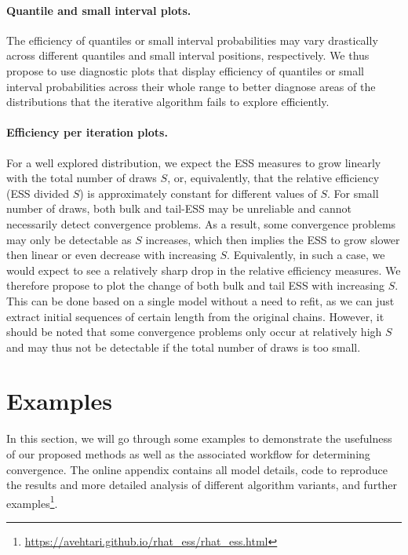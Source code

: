 \documentclass[american,]{article}
\let\oldparagraph\paragraph
\renewcommand{\paragraph}[1]{\oldparagraph{#1}\mbox{}}
\let\rmarkdownfootnote\footnote%
\def\footnote{\protect\rmarkdownfootnote}
\theoremstyle{definition}
\begin{document}
\hypertarget{quantile-and-small-interval-plots}{%
\paragraph{Quantile and small interval
plots.}\label{quantile-and-small-interval-plots}}
The efficiency of quantiles or small interval probabilities may vary
drastically across different quantiles and small interval positions,
respectively. We thus propose to use diagnostic plots that display
efficiency of quantiles or small interval probabilities across their
whole range to better diagnose areas of the distributions that the
iterative algorithm fails to explore efficiently.

\hypertarget{efficiency-change-plots}{%
\paragraph{Efficiency per iteration plots.}\label{efficiency-change-plots}}
For a well explored distribution, we expect the ESS measures to grow
linearly with the total number of draws \(S\), or, equivalently, that
the relative efficiency (ESS divided \(S\)) is approximately constant
for different values of \(S\). For small number of draws, both bulk and
tail-ESS may be unreliable and cannot necessarily detect convergence
problems. As a result, some convergence problems may only be
detectable as \(S\) increases, which then implies the ESS to grow slower
then linear or even decrease with increasing \(S\). Equivalently, in
such a case, we would expect to see a relatively sharp drop in the
relative efficiency measures. We therefore propose to plot the change of
both bulk and tail ESS with increasing \(S\). This can be done based on
a single model without a need to refit, as we can just extract initial
sequences of certain length from the original chains. However, it should
be noted that some convergence problems only occur at relatively high
\(S\) and may thus not be detectable if the total number of draws is too
small.

\hypertarget{examples}{%
\section{Examples}\label{examples}}

In this section, we will go through some examples to demonstrate the
usefulness of our proposed methods as well as the associated workflow
for determining convergence. The online appendix contains all model
details, code to reproduce the results and more detailed analysis of
different algorithm variants, and further
examples\footnote{\url{https://avehtari.github.io/rhat_ess/rhat_ess.html}}.
\end{document}
